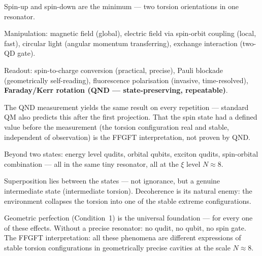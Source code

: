 \begin{conclusionBox}[Conclusion]
Spin-up and spin-down are the minimum ---
two torsion orientations in one resonator.

Manipulation: magnetic field (global), electric field
via spin-orbit coupling (local, fast), circular light
(angular momentum transferring), exchange interaction (two-QD gate).

Readout: spin-to-charge conversion (practical, precise),
Pauli blockade (geometrically self-reading),
fluorescence polarisation (invasive, time-resolved),
\textbf{Faraday/Kerr rotation (QND --- state-preserving, repeatable)}.

The QND measurement yields the same result on every repetition ---
standard QM also predicts this after the first projection.
That the spin state had a defined value before the measurement
(the torsion configuration real and stable, independent of
observation) is the FFGFT interpretation, not proven by QND.

Beyond two states:
energy level qudits, orbital qubits, exciton qudits,
spin-orbital combination --- all in the same
tiny resonator, all at the $\xi$ level $N \approx 8$.

Superposition lies between the states ---
not ignorance, but a genuine intermediate state
(intermediate torsion).
Decoherence is its natural enemy:
the environment collapses the torsion into one of the
stable extreme configurations.

Geometric perfection (Condition~1) is
the universal foundation --- for every one of these effects.
Without a precise resonator: no qudit, no qubit,
no spin gate. The FFGFT interpretation:
all these phenomena are different expressions
of stable torsion configurations in geometrically
precise cavities at the scale $N \approx 8$.
\end{conclusionBox}


